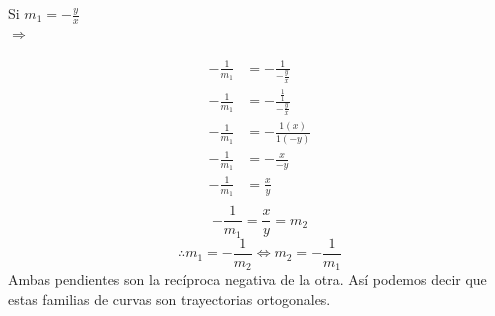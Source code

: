 \begin{center}
    Si $ m_{1}  = -\frac{y}{x} $ \\
    $\Rightarrow$ 
\end{center}
\begin{align*}
   -\frac{1}{m_{1}} &= -\frac{1}{-\frac{y}{x}}\\
   -\frac{1}{m_{1}} &= -\frac{\frac{1}{1}}{-\frac{y}{x}}\\
   -\frac{1}{m_{1}} &= -\frac{1(x)}{1(-y)}\\
   -\frac{1}{m_{1}} &= -\frac{x}{-y}\\
   -\frac{1}{m_{1}} &= \frac{x}{y}\\
\end{align*}
\[
  -\frac{1}{m_{1}} = \frac{x}{y} = m_{2}
\]
\[
\therefore  m_{1}  = -\frac{1}{m_{2}}   \Leftrightarrow   m_{2}  = -\frac{1}{m_{1}}
\]
\newline
Ambas pendientes son la recíproca negativa de la otra. Así podemos decir que estas familias de curvas son trayectorias ortogonales.